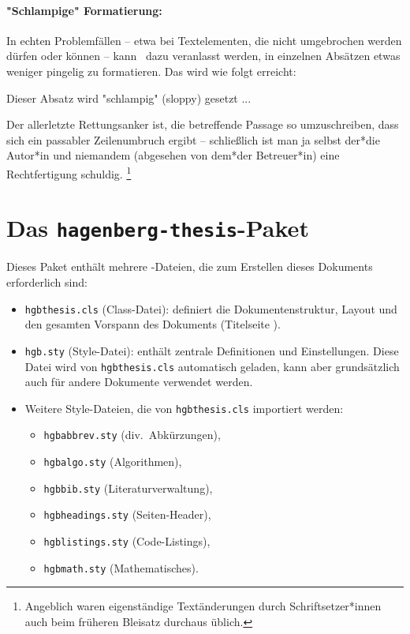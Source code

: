 \paragraph{"Schlampige" Formatierung:} In echten Problemfällen -- etwa bei
Textelementen, die nicht umgebrochen werden dürfen oder können -- kann
\latex\ dazu veranlasst werden, in einzelnen Absätzen etwas weniger pingelig
zu formatieren. Das wird wie folgt erreicht:
%
\begin{LaTeXCode}[numbers=none]
    \begin{sloppypar}
        Dieser Absatz wird "schlampig" (sloppy) gesetzt ...
    \end{sloppypar}
\end{LaTeXCode}
%
Der allerletzte Rettungsanker ist, die betreffende Passage so umzuschreiben,
dass sich ein passabler Zeilenumbruch ergibt -- schließlich ist man ja selbst
der*die Autor*in und niemandem (abgesehen von dem*der Betreuer*in) eine
Rechtfertigung schuldig.%
\footnote{Angeblich waren eigenständige Textänderungen durch Schriftsetzer*innen
auch beim früheren Bleisatz durchaus üblich.}


\section{Das \texttt{hagenberg-thesis}-Paket}

Dieses Paket enthält mehrere \latex-Dateien, die zum Erstellen dieses
Dokuments erforderlich sind:
%
\begin{itemize}
    \item \nolinkurl{hgbthesis.cls} (Class-Datei): definiert die
    Dokumentenstruktur, Layout und den gesamten Vorspann des Dokuments
    (Titelseite \etc).
    \item \nolinkurl{hgb.sty} (Style-Datei): enthält zentrale Definitionen
    und Einstellungen. Diese Datei wird von \nolinkurl{hgbthesis.cls}
    automatisch geladen, kann aber grundsätzlich auch für andere Dokumente
    verwendet werden.
    \item Weitere Style-Dateien, die von \nolinkurl{hgbthesis.cls} importiert
    werden:
    \begin{itemize}
        \item[] \nolinkurl{hgbabbrev.sty} (div.\ Abkürzungen),
        \item[] \nolinkurl{hgbalgo.sty} (Algorithmen),
        \item[] \nolinkurl{hgbbib.sty} (Literaturverwaltung),
        \item[] \nolinkurl{hgbheadings.sty} (Seiten-Header),
        \item[] \nolinkurl{hgblistings.sty} (Code-Listings),
        \item[] \nolinkurl{hgbmath.sty} (Mathematisches).
    \end{itemize}
\end{itemize}


